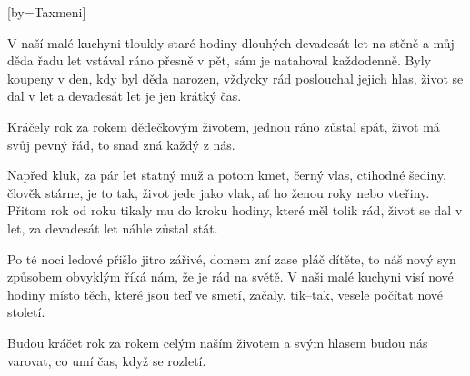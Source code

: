 [by={Taxmeni}]

\beginverse{}
V naší malé kuchyni tloukly staré hodiny
dlouhých devadesát let na stěně
a můj děda řadu let vstával ráno přesně v pět,
sám je natahoval každodenně.
Byly koupeny v den, kdy byl děda narozen,
vždycky rád poslouchal jejich hlas,
život se dal v let a devadesát let je jen krátký čas.
\endverse{}

\beginchorus{}
Kráčely rok za rokem dědečkovým životem,
jednou ráno zůstal spát, život má svůj pevný řád,
to snad zná každý z nás.
\endchorus{}

\beginverse{}
Napřed kluk, za pár let statný muž a potom kmet,
černý vlas, ctihodné šediny,
člověk stárne, je to tak, život jede jako vlak,
ať ho ženou roky nebo vteřiny.
Přitom rok od roku tikaly mu do kroku
hodiny, které měl tolik rád,
život se dal v let, za devadesát let náhle zůstal stát.
\endverse{}

\beginchorus{}
\phantom{}
\endchorus{}

\beginverse{}
Po té noci ledové přišlo jitro zářivé,
domem zní zase pláč dítěte,
to náš nový syn způsobem obvyklým
říká nám, že je rád na světě.
V naši malé kuchyni visí nové hodiny
místo těch, které jsou teď ve smetí,
začaly, tik--tak, vesele počítat nové století.
\endverse{}

\beginchorus{}
Budou kráčet rok za rokem celým naším životem
a svým hlasem budou nás varovat, co umí čas,
když se rozletí.
\endchorus{}

\endsong{}
